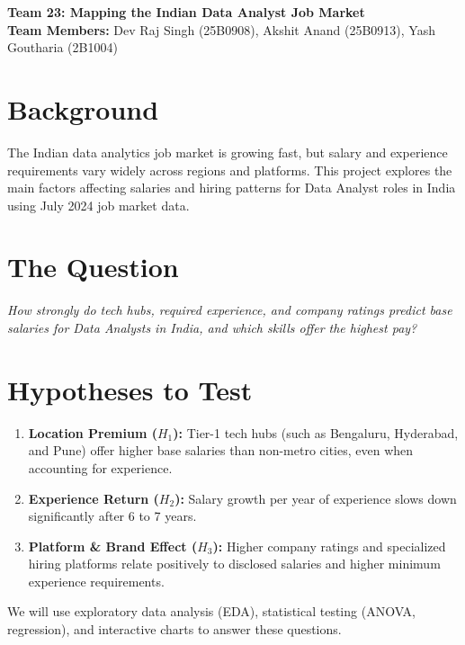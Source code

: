 \documentclass[11pt, a4paper]{article}
\begin{document}
\begin{center}
    {\Large \bfseries Team 23: Mapping the Indian Data Analyst Job Market} \\[0.4em]
    \textbf{Team Members:} Dev Raj Singh (25B0908), Akshit Anand (25B0913), Yash Goutharia (2B1004)
\end{center}

\vspace{0.5em}

\section*{Background}

The Indian data analytics job market is growing fast, but salary and experience requirements vary widely across regions and platforms. This project explores the main factors affecting salaries and hiring patterns for Data Analyst roles in India using July 2024 job market data.

\section*{The Question}
\textit{How strongly do tech hubs, required experience, and company ratings predict base salaries for Data Analysts in India, and which skills offer the highest pay?}

\vspace{0.5em}
\section*{Hypotheses to Test}
\begin{enumerate}
    \item \textbf{Location Premium ($H_1$):} Tier-1 tech hubs (such as Bengaluru, Hyderabad, and Pune) offer higher base salaries than non-metro cities, even when accounting for experience.
    \item \textbf{Experience Return ($H_2$):} Salary growth per year of experience slows down significantly after 6 to 7 years.
    \item \textbf{Platform \& Brand Effect ($H_3$):} Higher company ratings and specialized hiring platforms relate positively to disclosed salaries and higher minimum experience requirements.
\end{enumerate}

We will use exploratory data analysis (EDA), statistical testing (ANOVA, regression), and interactive charts to answer these questions.
\end{document}
